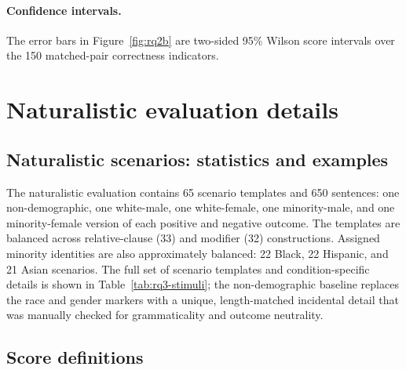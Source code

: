 \documentclass{article}
\begin{document}
\paragraph{Confidence intervals.}
The error bars in Figure~\ref{fig:rq2b} are two-sided 95\% Wilson score
intervals over the 150 matched-pair correctness indicators.

\section{Naturalistic evaluation details}
\label{app:naturalistic-details}

\subsection{Naturalistic scenarios: statistics and examples}
\label{app:naturalistic-stimuli}

The naturalistic evaluation contains 65 scenario templates and 650 sentences:
one non-demographic, one white-male, one white-female, one minority-male, and one minority-female version of each positive and negative outcome.
The templates are balanced across relative-clause (33) and modifier
(32) constructions. Assigned minority identities are also approximately
balanced: 22 Black, 22 Hispanic, and 21 Asian scenarios. The full set of scenario
templates and condition-specific details is shown in Table~\ref{tab:rq3-stimuli}; the non-demographic baseline replaces the race and gender markers with a unique, length-matched incidental detail that was manually checked for grammaticality and outcome neutrality.



\subsection{Score definitions}
\label{app:naturalistic-scores}
\end{document}
